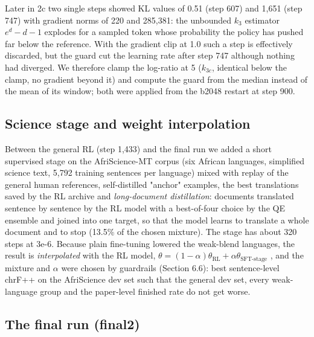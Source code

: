 Later in 2c two single steps showed KL values of 0.51 (step 607) and 1,651 (step 747) with gradient norms of 220 and 285,381: the unbounded \(k_3\) estimator \(e^{d}-d-1\) explodes for a sampled token whose probability the policy has pushed far below the reference. With the gradient clip at 1.0 such a step is effectively discarded, but the guard cut the learning rate after step 747 although nothing had diverged. We therefore clamp the log-ratio at 5 (\(k_{3c}\), identical below the clamp, no gradient beyond it) and compute the guard from the median instead of the mean of its window; both were applied from the b2048 restart at step 900.

\subsection{Science stage and weight interpolation}\label{science-stage-and-weight-interpolation}

Between the general RL (step 1,433) and the final run we added a short supervised stage on the AfriScience-MT corpus \citep{abdulmumin2026afriscience} (six African languages, simplified science text, 5,792 training sentences per language) mixed with replay of the general human references, self-distilled "anchor" examples, the best translations saved by the RL archive and \emph{long-document distillation}: documents translated sentence by sentence by the RL model with a best-of-four choice by the QE ensemble and joined into one target, so that the model learns to translate a whole document and to stop (13.5\% of the chosen mixture). The stage has about 320 steps at 3e-6. Because plain fine-tuning lowered the weak-blend languages, the result is \emph{interpolated} with the RL model, \(\theta=(1-\alpha)\theta_{\text{RL}}+\alpha\theta_{\text{SFT-stage}}\) \citep{wortsman2022robust}, and the mixture and \(\alpha\) were chosen by guardrails (Section 6.6): best sentence-level chrF++ on the AfriScience dev set such that the general dev set, every weak-language group and the paper-level finished rate do not get worse.

\subsection{The final run (final2)}\label{the-final-run-final2}

